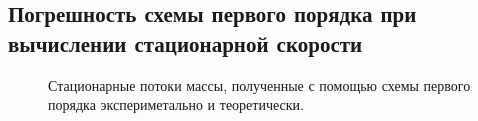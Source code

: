 \documentclass[a4paper,10pt]{article}
\begin{document}
\subsection{Погрешность схемы первого порядка при вычислении стационарной скорости}\label{sec:first}
\begin{figure}[h]
	\caption{Стационарные потоки массы, полученные с помощью схемы первого порядка экспериметально и теоретически.}\label{fig:first_model}
\end{figure}
\end{document}
